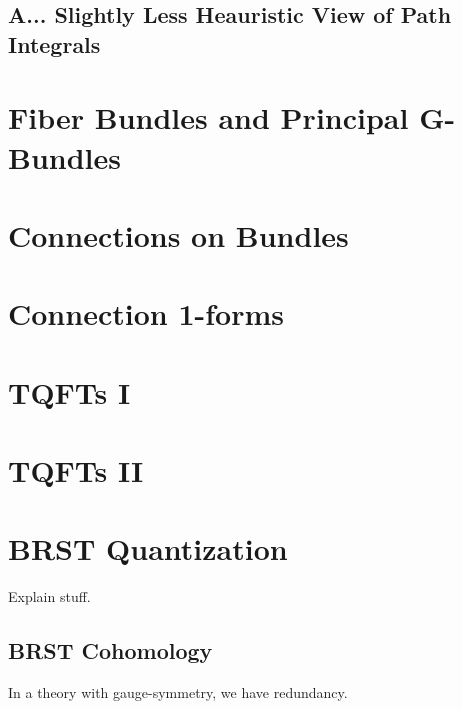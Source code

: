 \documentclass[11pt]{article}
\begin{document}
\subsection{A... Slightly Less Heauristic View of Path Integrals}



\newpage
\section{Fiber Bundles and Principal G-Bundles}
\vskip 0.5cm


\newpage
\section{Connections on Bundles}
\vskip 0.5cm


\newpage
\section{Connection 1-forms}
\vskip 0.5cm


\newpage
\section{TQFTs I}
\vskip 0.5cm


\newpage
\section{TQFTs II}
\vskip 0.5cm


\newpage
\section{BRST Quantization}
\vskip 0.5cm
Explain stuff.


\vskip 0.5cm
\subsection{BRST Cohomology}

In a theory with gauge-symmetry, we have redundancy. 


\newpage
\vskip 0.5cm
\end{document}
